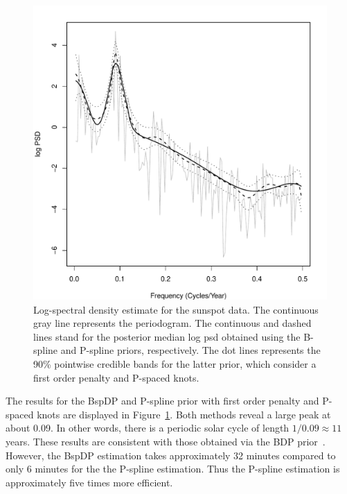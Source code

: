 \documentclass[twocolumn,final]{svjour3}
\begin{document}
\begin{figure}[]
	\centering
	\includegraphics[scale=0.40,clip=true,angle=0]{sunspot.pdf}
	\caption{Log-spectral density estimate for the sunspot data. The continuous gray line represents the periodogram.  The continuous and dashed lines stand for the posterior median log psd obtained using the B-spline and P-spline priors, respectively.  The dot lines represents the 90\% pointwise credible bands for the latter prior, which consider a first order penalty and P-spaced knots.}
	\label{fig:sunspot}
\end{figure}


The results for the BspDP and P-spline prior  with first order penalty and P-spaced knots are displayed in Figure~\ref{fig:sunspot}.  Both methods reveal a large peak at about 0.09. In other words, there is a periodic solar cycle of length $1/ 0.09 \approx 11$ years.  These results are consistent with those obtained via the BDP  prior~\citep{Choudhuri:2004}.
However, the BspDP estimation takes approximately 32 minutes compared to only 6 minutes for the the P-spline estimation. Thus the P-spline estimation is approximately
five times more efficient.
\end{document}
